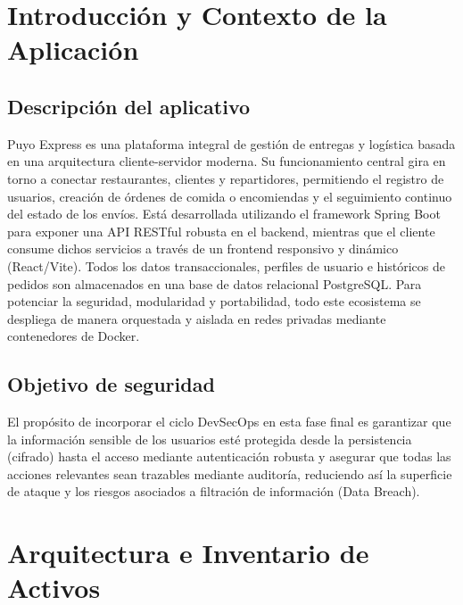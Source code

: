 \documentclass[11pt,oneside]{article}
\begin{document}
\begin{titlepage}
\end{titlepage}

\tableofcontents
\clearpage
{}

\section{Introducción y Contexto de la Aplicación}

\subsection{Descripción del aplicativo}
Puyo Express es una plataforma integral de gestión de entregas y logística basada en una arquitectura cliente-servidor moderna. Su funcionamiento central gira en torno a conectar restaurantes, clientes y repartidores, permitiendo el registro de usuarios, creación de órdenes de comida o encomiendas y el seguimiento continuo del estado de los envíos. Está desarrollada utilizando el framework Spring Boot para exponer una API RESTful robusta en el backend, mientras que el cliente consume dichos servicios a través de un frontend responsivo y dinámico (React/Vite). Todos los datos transaccionales, perfiles de usuario e históricos de pedidos son almacenados en una base de datos relacional PostgreSQL. Para potenciar la seguridad, modularidad y portabilidad, todo este ecosistema se despliega de manera orquestada y aislada en redes privadas mediante contenedores de Docker.

\subsection{Objetivo de seguridad}
El propósito de incorporar el ciclo DevSecOps en esta fase final es garantizar que la información sensible de los usuarios esté protegida desde la persistencia (cifrado) hasta el acceso mediante autenticación robusta y asegurar que todas las acciones relevantes sean trazables mediante auditoría, reduciendo así la superficie de ataque y los riesgos asociados a filtración de información (Data Breach).

\section{Arquitectura e Inventario de Activos}
\end{document}
